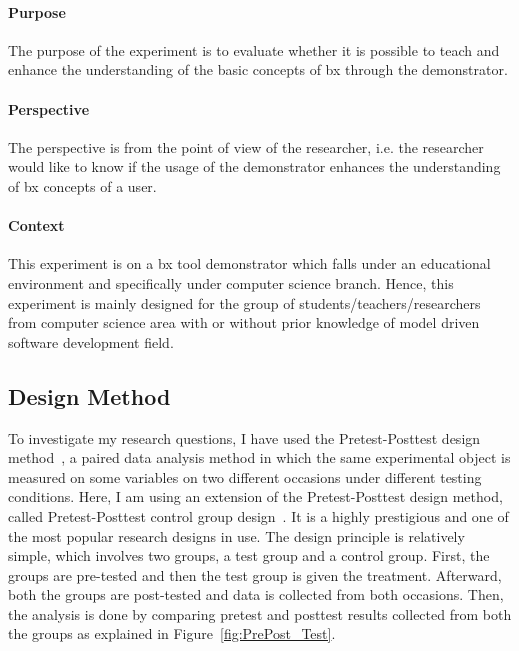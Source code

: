 \paragraph{Purpose}
The purpose of the experiment is to evaluate whether it is possible to teach and enhance the understanding of the basic concepts of bx through the demonstrator.

\paragraph{Perspective}
The perspective is from the point of view of the researcher, i.e. the researcher would like to know if the usage of the demonstrator enhances the understanding of bx concepts of a user.

\paragraph{Context}
This experiment is on a bx tool demonstrator which falls under an educational environment and specifically under computer science branch. Hence, this experiment is mainly designed for the group of students/teachers/researchers from computer science area with or without prior knowledge of model driven software development field.

\subsection{Design Method}\label{subsec:designmethod} 
To investigate my research questions, I have used the Pretest-Posttest design method~\cite{analysisprepostdesigns}, a paired data analysis method in which the same experimental object is measured on some variables on two different occasions under different testing conditions. Here, I am using an extension of the Pretest-Posttest design method, called Pretest-Posttest control group design~\cite{expandquasiexpdesign}. It is a highly prestigious and one of the most popular research designs in use. The design principle is relatively simple, which involves two groups, a test group and a control group. First, the groups are pre-tested and then the test group is given the treatment. Afterward, both the groups are post-tested and data is collected from both occasions. Then, the analysis is done by comparing pretest and posttest results collected from both the groups as explained in Figure~\ref{fig:PrePost_Test}.


